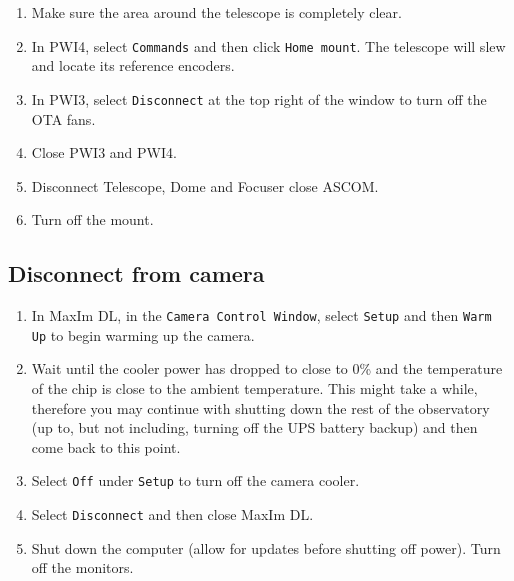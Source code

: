 \documentclass{article}
\begin{document}
	\begin{enumerate}
		
		\item Make sure the area around the telescope is completely clear.
		
		\item In PWI4, select \texttt{Commands} and then click \texttt{Home mount}. The telescope will slew and locate its reference encoders.
		
		\item In PWI3, select \texttt{Disconnect} at the top right of the window to turn off the OTA fans.
		
		\item Close PWI3 and PWI4.
		\item Disconnect Telescope, Dome and Focuser close ASCOM.
		
		\item Turn off the mount.
		
	\end{enumerate}
	
	\subsection{Disconnect from camera}
	
	\begin{enumerate}
		
		\item In MaxIm DL, in the \texttt{Camera Control Window}, select \texttt{Setup} and then \texttt{Warm Up} to begin warming up the camera.
		
		\item Wait until the cooler power has dropped to close to 0\% and the temperature of the chip is close to the ambient temperature. This might take a while, therefore you may continue with shutting down the rest of the observatory (up to, but not including, turning off the UPS battery backup) and then come back to this point.
		
		\item Select \texttt{Off} under \texttt{Setup} to turn off the camera cooler.
		
		\item Select \texttt{Disconnect} and then close MaxIm DL.
		
		\item Shut down the computer (allow for updates before shutting off power). Turn off the monitors.
		
	\end{enumerate}
	
\end{document}
